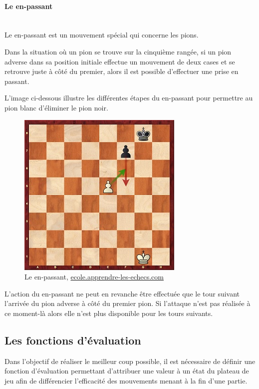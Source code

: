 \documentclass{article}
\begin{document}
\paragraph{Le en-passant}
~~\\

Le en-passant est un mouvement spécial qui concerne les pions.

Dans la situation où un pion se trouve sur la cinquième rangée, si un pion adverse dans sa position initiale effectue un mouvement de deux cases et se retrouve juste à côté du premier, alors il est possible d'effectuer une prise en passant.

L'image ci-dessous illustre les différentes étapes du en-passant pour permettre au pion blanc d'éliminer le pion noir.

\begin{figure}[!h]
\centering
\includegraphics[scale=0.8]{img/en-passant.jpg}
\caption{Le en-passant,
\href{https://ecole.apprendre-les-echecs.com/la-prise-en-passant/}{ecole.apprendre-les-echecs.com}}
\end{figure}

L'action du en-passant ne peut en revanche être effectuée que le tour suivant l'arrivée du pion adverse à côté du premier pion. Si l'attaque n'est pas réalisée à ce moment-là alors elle n'est plus disponible pour les tours suivants.

\subsection{Les fonctions d'évaluation}\label{heuristique_contexte}
Dans l'objectif de réaliser le meilleur coup possible, il est nécessaire de définir une fonction d'évaluation permettant d'attribuer une valeur à un état du plateau de jeu afin de différencier l'efficacité des mouvements menant à la fin d'une partie.
\end{document}
